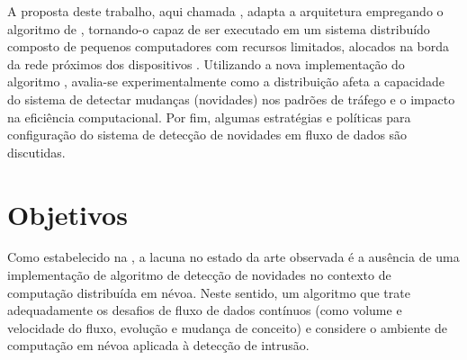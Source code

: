 A proposta deste trabalho, aqui chamada \mfog, adapta a arquitetura \arch
\cite{Cassales2019} empregando o algoritmo de \nd \minas \cite{Faria2016minas},
tornando-o capaz de ser executado em um sistema distribuído composto de pequenos
computadores com recursos limitados, alocados na borda da rede próximos dos
dispositivos \iot.
Utilizando a nova implementação do algoritmo \minas, avalia-se experimentalmente
como a distribuição afeta a capacidade do sistema de detectar mudanças
(novidades) nos padrões de tráfego e o impacto na eficiência computacional.
Por fim, algumas estratégias e políticas para configuração do sistema de
detecção de novidades em fluxo de dados são discutidas.



\section{Objetivos}\label{sec:objetivos}

Como estabelecido na , a lacuna no estado da arte observada é a
ausência de uma implementação de algoritmo de detecção de novidades no contexto
de computação distribuída em névoa.
Neste sentido, um algoritmo que trate adequadamente os desafios de fluxo de
dados contínuos (como volume e velocidade do fluxo, evolução e mudança de
conceito) e considere o ambiente de computação em névoa aplicada à detecção de
intrusão.


